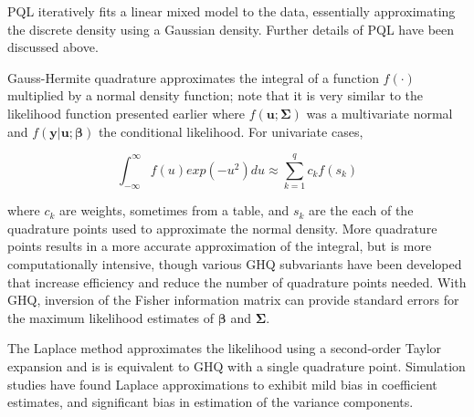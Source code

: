 \documentclass[Afour,times,sagev,doublespace]{sagej}
\begin{document}
\begin{sm}
PQL iteratively fits a linear mixed model\cite{lin_bias_1996} to the data, essentially approximating the discrete density using a Gaussian density\cite{ng_estimation_2006}. Further details of PQL have been discussed above.

Gauss-Hermite quadrature approximates the integral of a function $f(\cdot)$ multiplied by a normal density function; note that it is very similar to the likelihood function presented earlier where $f(\mathbf{u}; \mathbf{\Sigma})$ was a multivariate normal and $f(\mathbf{y}|\mathbf{u};\boldsymbol{\beta})$ the conditional likelihood. For univariate cases,

\begin{equation}
    \int_{-\infty}^{\infty}f(u)exp(-u^2)du \approx \sum_{k=1}^q c_kf(s_k)
\end{equation}

where $c_k$ are weights, sometimes from a table, and $s_k$ are the each of the quadrature points used to approximate the normal density. More quadrature points results in a more accurate approximation of the integral, but is more computationally intensive, though various GHQ subvariants have been developed that increase efficiency and reduce the number of quadrature points needed\cite{pinheiro_efficient_2006}. With GHQ, inversion of the Fisher information matrix can provide standard errors for the maximum likelihood estimates of $\boldsymbol{\beta}$ and $\mathbf{\Sigma}$. 


The Laplace method approximates the likelihood using a second-order Taylor expansion \cite{pinheiro_approximations_1995} and is is equivalent to GHQ with a single quadrature point\cite{liu_note_1994}. Simulation studies have found Laplace approximations to exhibit mild bias in coefficient estimates, and significant bias in estimation of the variance components\cite{pinheiro_efficient_2006}.
\end{sm}















\end{document}
